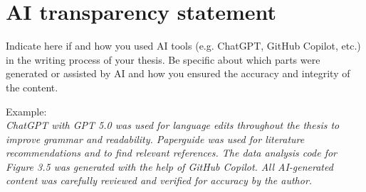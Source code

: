 \chapter{AI transparency statement}
{
    \color{orange}
    Indicate here if and how you used AI tools (e.g. ChatGPT, GitHub Copilot, etc.) in the writing process of your thesis. 
    Be specific about which parts were generated or assisted by AI and how you ensured the accuracy and integrity of the content.

    Example:\\
    \emph{ChatGPT with GPT 5.0 was used for language edits throughout the thesis to improve grammar and readability. 
    Paperguide was used for literature recommendations and to find relevant references.
    The data analysis code for Figure 3.5 was generated with the help of GitHub Copilot. 
    All AI-generated content was carefully reviewed and verified for accuracy by the author.}
    
}
